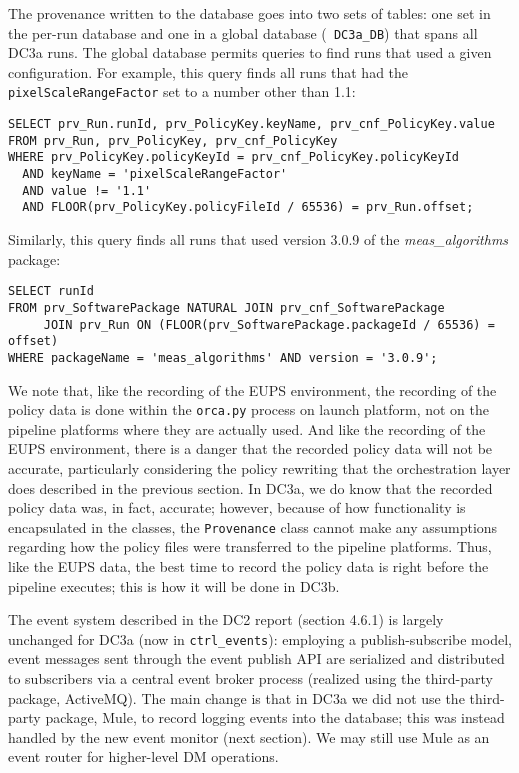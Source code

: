 The provenance written to the database goes into two sets of tables: one
set in the per-run database and one in a global database ({\tt
DC3a\_DB}) that spans all DC3a runs.  The global database permits
queries to find runs that used a given configuration.  For example, this
query finds all runs that had the {\tt pixelScaleRangeFactor} set to a
number other than 1.1:

\begin{verbatim}
SELECT prv_Run.runId, prv_PolicyKey.keyName, prv_cnf_PolicyKey.value
FROM prv_Run, prv_PolicyKey, prv_cnf_PolicyKey
WHERE prv_PolicyKey.policyKeyId = prv_cnf_PolicyKey.policyKeyId
  AND keyName = 'pixelScaleRangeFactor'
  AND value != '1.1'
  AND FLOOR(prv_PolicyKey.policyFileId / 65536) = prv_Run.offset;
\end{verbatim}

Similarly, this query finds all runs that used version 3.0.9 of the {\it
meas\_algorithms} package:

\begin{verbatim}
SELECT runId
FROM prv_SoftwarePackage NATURAL JOIN prv_cnf_SoftwarePackage
     JOIN prv_Run ON (FLOOR(prv_SoftwarePackage.packageId / 65536) = offset)
WHERE packageName = 'meas_algorithms' AND version = '3.0.9';
\end{verbatim}

We note that, like the recording of the EUPS environment, the
recording of the policy data is done within the {\tt orca.py} process
on launch platform, not on the pipeline platforms where they are
actually used.  And like the recording of the EUPS environment, there
is a danger that the recorded policy data will not be accurate,
particularly considering the policy rewriting that the orchestration
layer does described in the previous section.  In DC3a, we do
know that the recorded policy data was, in fact, accurate; however,
because of how functionality is encapsulated in the  classes, the
{\tt Provenance} class cannot make any assumptions regarding how the
policy files were transferred to the pipeline platforms.  Thus, like
the EUPS data, the best time to record the policy data is right before
the pipeline executes; this is how it will be done in DC3b.  

 \label{sec:events}

The event system described in the DC2 report (section 4.6.1) is
largely unchanged for DC3a (now in {\tt ctrl\_events}):  employing a
publish-subscribe model, event messages sent through the event publish
API are serialized and distributed to subscribers via a central event
broker process (realized using the third-party package, ActiveMQ).
The main change is that in DC3a we did not use the third-party
package, Mule, to record logging events into the database; this was
instead handled by the new event monitor (next section).  We may still
use Mule as an event router for higher-level DM operations.   

